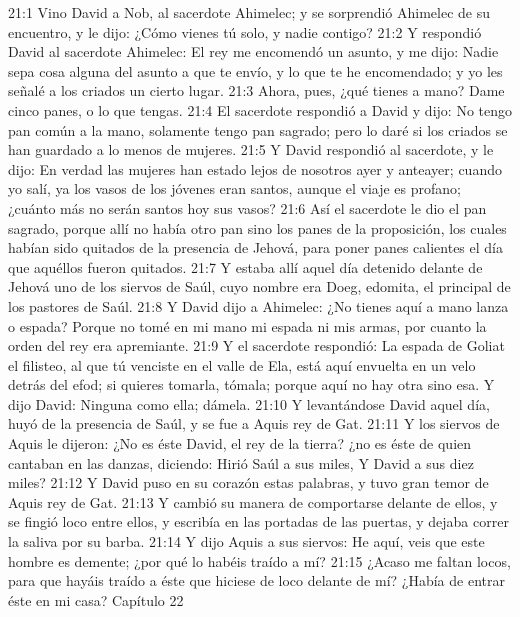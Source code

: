 21:1 Vino David a Nob, al sacerdote Ahimelec; y se sorprendió Ahimelec de su encuentro, y le dijo: ¿Cómo vienes tú solo, y nadie contigo?  
21:2 Y respondió David al sacerdote Ahimelec: El rey me encomendó un asunto, y me dijo: Nadie sepa cosa alguna del asunto a que te envío, y lo que te he encomendado; y yo les señalé a los criados un cierto lugar.  
21:3 Ahora, pues, ¿qué tienes a mano? Dame cinco panes, o lo que tengas.  
21:4 El sacerdote respondió a David y dijo: No tengo pan común a la mano, solamente tengo pan sagrado; pero lo daré si los criados se han guardado a lo menos de mujeres.  
21:5 Y David respondió al sacerdote, y le dijo: En verdad las mujeres han estado lejos de nosotros ayer y anteayer; cuando yo salí, ya los vasos de los jóvenes eran santos, aunque el viaje es profano; ¿cuánto más no serán santos hoy sus vasos?  
21:6 Así el sacerdote le dio el pan sagrado, porque allí no había otro pan sino los panes de la proposición, los cuales habían sido quitados de la presencia de Jehová, para poner panes calientes el día que aquéllos fueron quitados.  
21:7 Y estaba allí aquel día detenido delante de Jehová uno de los siervos de Saúl, cuyo nombre era Doeg, edomita, el principal de los pastores de Saúl.  
21:8 Y David dijo a Ahimelec: ¿No tienes aquí a mano lanza o espada? Porque no tomé en mi mano mi espada ni mis armas, por cuanto la orden del rey era apremiante.  
21:9 Y el sacerdote respondió: La espada de Goliat el filisteo, al que tú venciste en el valle de Ela, está aquí envuelta en un velo detrás del efod; si quieres tomarla, tómala; porque aquí no hay otra sino esa. Y dijo David: Ninguna como ella; dámela.  
21:10 Y levantándose David aquel día, huyó de la presencia de Saúl, y se fue a Aquis rey de Gat.  
21:11 Y los siervos de Aquis le dijeron: ¿No es éste David, el rey de la tierra? ¿no es éste de quien cantaban en las danzas, diciendo:  
Hirió Saúl a sus miles,  
Y David a sus diez miles? 
21:12 Y David puso en su corazón estas palabras, y tuvo gran temor de Aquis rey de Gat.  
21:13 Y cambió su manera de comportarse delante de ellos, y se fingió loco entre ellos, y escribía en las portadas de las puertas, y dejaba correr la saliva por su barba.  
21:14 Y dijo Aquis a sus siervos: He aquí, veis que este hombre es demente; ¿por qué lo habéis traído a mí?  
21:15 ¿Acaso me faltan locos, para que hayáis traído a éste que hiciese de loco delante de mí? ¿Había de entrar éste en mi casa?  
Capítulo 22 

